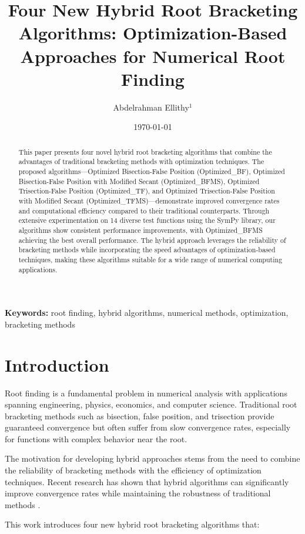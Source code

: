 \documentclass[11pt,a4paper]{article}
\title{\textbf{Four New Hybrid Root Bracketing Algorithms: Optimization-Based Approaches for Numerical Root Finding}}
\author{
    Abdelrahman Ellithy$^{1}$ 
}
\date{\today}
\begin{document}
\maketitle

\begin{abstract}
This paper presents four novel hybrid root bracketing algorithms that combine the advantages of traditional bracketing methods with optimization techniques. The proposed algorithms—Optimized Bisection-False Position (Optimized\_BF), Optimized Bisection-False Position with Modified Secant (Optimized\_BFMS), Optimized Trisection-False Position (Optimized\_TF), and Optimized Trisection-False Position with Modified Secant (Optimized\_TFMS)—demonstrate improved convergence rates and computational efficiency compared to their traditional counterparts. Through extensive experimentation on 14 diverse test functions using the SymPy library, our algorithms show consistent performance improvements, with Optimized\_BFMS achieving the best overall performance. The hybrid approach leverages the reliability of bracketing methods while incorporating the speed advantages of optimization-based techniques, making these algorithms suitable for a wide range of numerical computing applications.
\end{abstract}

\noindent\textbf{Keywords:} root finding, hybrid algorithms, numerical methods, optimization, bracketing methods

\section{Introduction}

Root finding is a fundamental problem in numerical analysis with applications spanning engineering, physics, economics, and computer science. Traditional root bracketing methods such as bisection, false position, and trisection provide guaranteed convergence but often suffer from slow convergence rates, especially for functions with complex behavior near the root.

The motivation for developing hybrid approaches stems from the need to combine the reliability of bracketing methods with the efficiency of optimization techniques. Recent research has shown that hybrid algorithms can significantly improve convergence rates while maintaining the robustness of traditional methods \cite{sabharwal2019blended, badr2022novel}.

This work introduces four new hybrid root bracketing algorithms that:
\end{document}
